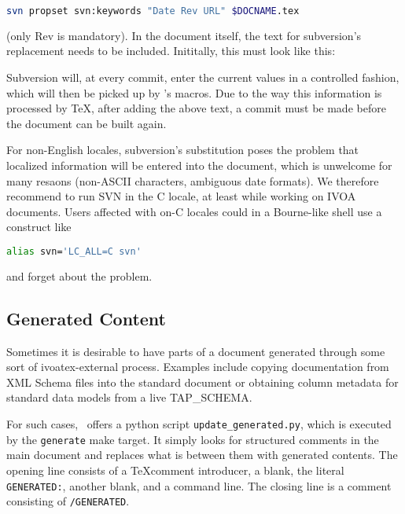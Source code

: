 \documentclass[11pt,a4paper]{ivoa}
\begin{document}
\begin{lstlisting}[language=sh]
svn propset svn:keywords "Date Rev URL" $DOCNAME.tex
\end{lstlisting}

(only Rev is mandatory).
In the document itself, the text for subversion's replacement needs to
be included.  Inititally, this must look like this:



Subversion will, at every commit, enter the current values in a
controlled fashion, which will then be picked up by \ivoatex's macros.
Due to the way this information is processed by \TeX, after adding the above
text, a commit must be made before the document can be built again.

For non-English locales, subversion's substitution poses the problem that
localized information will be entered into the document, which is
unwelcome for many resaons (non-ASCII characters, ambiguous date
formats).  We therefore recommend to run SVN in the C
locale, at least while working on IVOA documents.  Users affected with
on-C locales
could in a Bourne-like shell use a construct like

\begin{lstlisting}[language=sh]
alias svn='LC_ALL=C svn'
\end{lstlisting}

and forget about the problem.


\subsection{Generated Content}
\label{sect:generated}

Sometimes it is desirable to have parts of a document generated through
some sort of ivoatex-external process.  Examples include copying
documentation from XML Schema files into the standard document 
or obtaining column metadata for standard
data models from a live TAP\_SCHEMA.

For such cases, \ivoatex\ offers a python script
\texttt{update\_generated.py}, which is executed by the
\texttt{generate} make target.  It simply looks for structured comments
in the main document and replaces what is between them with generated
contents.  The opening line consists of a \TeX comment introducer, a
blank, the literal \texttt{GENERATED:}, another blank, and a command
line.  The closing line is a comment consisting of \texttt{/GENERATED}.
\end{document}
